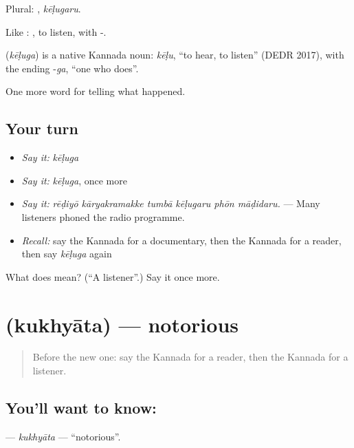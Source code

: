Plural: , \emph{kēḷugaru}.

Like : , to listen, with -.

\begin{cousinweb}
\textbf{} (\emph{kēḷuga}) is a native Kannada noun: \emph{kēḷu}, \textquotedblleft{}to hear, to listen\textquotedblright{} (DEDR 2017), with the ending -\emph{ga}, \textquotedblleft{}one who does\textquotedblright{}.
\end{cousinweb}

\begin{grammarlens}[title={What you've built}]
One more word for telling what happened.
\end{grammarlens}

\subsection*{Your turn}
\begin{itemize}
\raggedright
  \item \emph{Say it:} \emph{kēḷuga}
  \item \emph{Say it:} \emph{kēḷuga}, once more
  \item \emph{Say it:} \emph{rēḍiyō kāryakramakke tumbā kēḷugaru phōn māḍidaru.} — Many listeners phoned the radio programme.
  \item \emph{Recall:} say the Kannada for a documentary, then the Kannada for a reader, then say \emph{kēḷuga} again
\end{itemize}

\begin{tcolorbox}[breakable,colback=teal!4,colframe=teal!35!black,title={Before you move on}]
What does  mean? (\textquotedblleft{}A listener\textquotedblright{}.) Say it once more.
\end{tcolorbox}
\section[\texorpdfstring{\kn{ಕುಖ್ಯಾತ} (kukhyāta)}{ಕುಖ್ಯಾತ (kukhyāta)}]{ (kukhyāta) — notorious}

\label{lesson:KA-C370-kukhyata}



\begin{quote}
Before the new one: say the Kannada for a reader, then the Kannada for a listener.
\end{quote}

\subsection*{You'll want to know: }
\textbf{} — \emph{kukhyāta} — \textquotedblleft{}notorious\textquotedblright{}.

